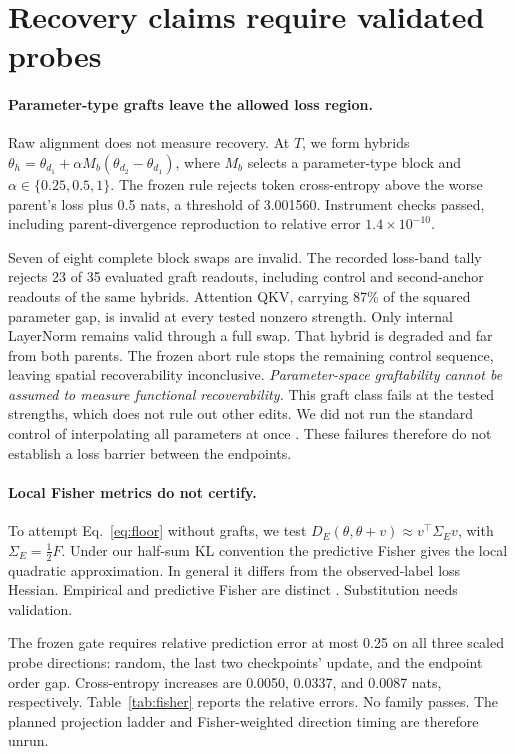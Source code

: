 \documentclass{article}
\begin{document}
\section{Recovery claims require validated probes}
\paragraph{Parameter-type grafts leave the allowed loss region.}
Raw alignment does not measure recovery. At $T$, we form hybrids $\theta_h=\theta_{d_1}+\alpha M_b(\theta_{d_2}-\theta_{d_1})$, where $M_b$ selects a parameter-type block and $\alpha\in\{0.25,0.5,1\}$. The frozen rule rejects token cross-entropy above the worse parent's loss plus 0.5 nats, a threshold of 3.001560. Instrument checks passed, including parent-divergence reproduction to relative error $1.4\times10^{-10}$.

Seven of eight complete block swaps are invalid. The recorded loss-band tally rejects 23 of 35 evaluated graft readouts, including control and second-anchor readouts of the same hybrids. Attention QKV, carrying 87\% of the squared parameter gap, is invalid at every tested nonzero strength. Only internal LayerNorm remains valid through a full swap. That hybrid is degraded and far from both parents. The frozen abort rule stops the remaining control sequence, leaving spatial recoverability inconclusive. \emph{Parameter-space graftability cannot be assumed to measure functional recoverability.} This graft class fails at the tested strengths, which does not rule out other edits. We did not run the standard control of interpolating all parameters at once \citep{frankle}. These failures therefore do not establish a loss barrier between the endpoints.

\paragraph{Local Fisher metrics do not certify.}
To attempt Eq.~\eqref{eq:floor} without grafts, we test $D_E(\theta,\theta+v)\approx v^\top\Sigma_Ev$, with $\Sigma_E=\tfrac12\widehat F$. Under our half-sum KL convention the predictive Fisher gives the local quadratic approximation. In general it differs from the observed-label loss Hessian. Empirical and predictive Fisher are distinct \citep{kunstner}. Substitution needs validation.

The frozen gate requires relative prediction error at most 0.25 on all three scaled probe directions: random, the last two checkpoints' update, and the endpoint order gap. Cross-entropy increases are 0.0050, 0.0337, and 0.0087 nats, respectively. Table~\ref{tab:fisher} reports the relative errors. No family passes. The planned projection ladder and Fisher-weighted direction timing are therefore unrun.
\end{document}
